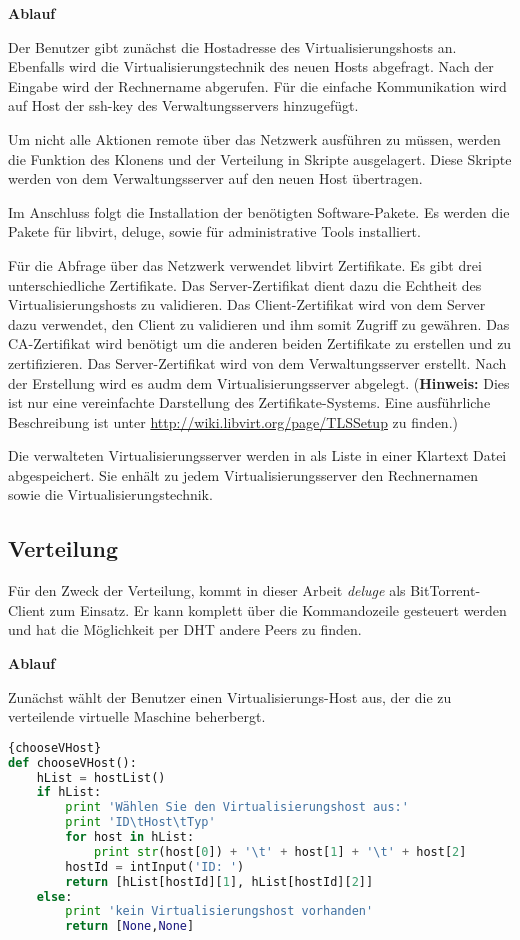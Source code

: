 \textbf{Ablauf}

Der Benutzer gibt zunächst die Hostadresse des Virtualisierungshosts an. Ebenfalls wird die Virtualisierungstechnik des neuen Hosts abgefragt. Nach der Eingabe wird der Rechnername abgerufen. Für die einfache Kommunikation wird auf Host der ssh-key des Verwaltungsservers hinzugefügt. 

Um nicht alle Aktionen remote über das Netzwerk ausführen zu müssen, werden die Funktion des Klonens und der Verteilung in Skripte ausgelagert. Diese Skripte werden von dem Verwaltungsserver auf den neuen Host übertragen.

Im Anschluss folgt die Installation der benötigten Software-Pakete. Es werden die Pakete für libvirt, deluge, sowie für administrative Tools installiert. 

Für die Abfrage über das Netzwerk verwendet libvirt Zertifikate. Es gibt drei unterschiedliche Zertifikate. Das Server-Zertifikat dient dazu die Echtheit des Virtualisierungshosts zu validieren. Das Client-Zertifikat wird von dem Server dazu verwendet, den Client zu validieren und ihm somit Zugriff zu gewähren. Das CA-Zertifikat wird benötigt um die anderen beiden Zertifikate zu erstellen und zu zertifizieren. Das Server-Zertifikat wird von dem Verwaltungsserver erstellt. Nach der Erstellung wird es audm dem Virtualisierungsserver abgelegt. (\textbf{Hinweis:} Dies ist nur eine vereinfachte Darstellung des Zertifikate-Systems. Eine ausführliche Beschreibung ist unter \href{http://wiki.libvirt.org/page/TLSSetup}{http://wiki.libvirt.org/page/TLSSetup} zu finden.) 

Die verwalteten Virtualisierungsserver werden in als Liste in einer Klartext Datei abgespeichert. Sie enhält zu jedem Virtualisierungsserver den Rechnernamen sowie die Virtualisierungstechnik. 

\subsection{Verteilung}
Für den Zweck der Verteilung, kommt in dieser Arbeit \textit{deluge} als BitTorrent-Client zum Einsatz. Er kann komplett über die Kommandozeile gesteuert werden und hat die Möglichkeit per DHT andere Peers zu finden.

\textbf{Ablauf}

Zunächst wählt der Benutzer einen Virtualisierungs-Host aus, der die zu verteilende virtuelle Maschine beherbergt. 
\\
\begin{lstlisting}[caption=VHost-Auswahl,language=Python,label=chooseVHost]{chooseVHost}
def chooseVHost():
	hList = hostList()
	if hList:
		print 'Wählen Sie den Virtualisierungshost aus:'
		print 'ID\tHost\tTyp'
		for host in hList:
			print str(host[0]) + '\t' + host[1] + '\t' + host[2]
		hostId = intInput('ID: ')
		return [hList[hostId][1], hList[hostId][2]]
	else:
		print 'kein Virtualisierungshost vorhanden'
		return [None,None]
\end{lstlisting}

